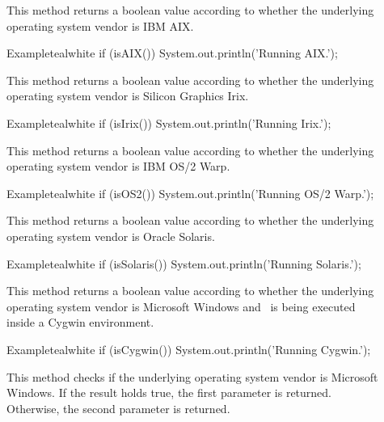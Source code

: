 \begin{description}
\item[] This method returns a boolean value according to whether the underlying operating system vendor is IBM AIX.

\begin{codebox}{Example}{teal}{\icnote}{white}
if (isAIX()) { System.out.println('Running AIX.'); }
\end{codebox}

\item[] This method returns a boolean value according to whether the underlying operating system vendor is Silicon Graphics Irix.

\begin{codebox}{Example}{teal}{\icnote}{white}
if (isIrix()) { System.out.println('Running Irix.'); }
\end{codebox}

\item[] This method returns a boolean value according to whether the underlying operating system vendor is IBM OS/2 Warp.

\begin{codebox}{Example}{teal}{\icnote}{white}
if (isOS2()) { System.out.println('Running OS/2 Warp.'); }
\end{codebox}

\item[] This method returns a boolean value according to whether the underlying operating system vendor is Oracle Solaris.

\begin{codebox}{Example}{teal}{\icnote}{white}
if (isSolaris()) { System.out.println('Running Solaris.'); }
\end{codebox}

\item[] This method returns a boolean value according to whether the underlying operating system vendor is Microsoft Windows and \arara\ is being executed inside a Cygwin environment.

\begin{codebox}{Example}{teal}{\icnote}{white}
if (isCygwin()) { System.out.println('Running Cygwin.'); }
\end{codebox}

\item[] This method checks if the underlying operating system vendor is Microsoft Windows. If the result holds true, the first parameter is returned. Otherwise, the second parameter is returned.


\end{description}
